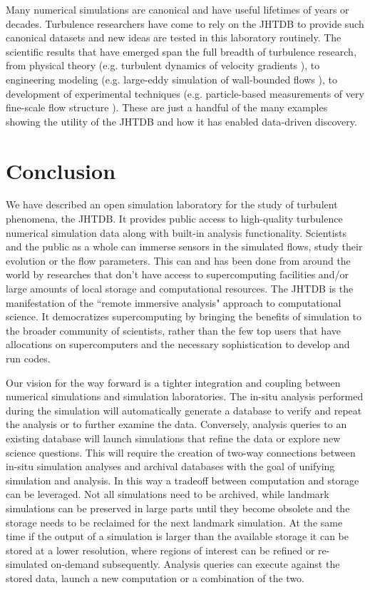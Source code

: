 \documentclass[10pt,twocolumn]{article}
\begin{document}
Many numerical simulations are canonical and have useful lifetimes of years or decades. Turbulence researchers have come to rely on the JHTDB to 
provide such canonical datasets and new ideas are tested in this laboratory routinely. The scientific results that have emerged span the full breadth of 
turbulence research, from physical theory (e.g. turbulent dynamics of velocity gradients \cite{luethi2009expanding}), to engineering modeling 
(e.g. large-eddy simulation of wall-bounded flows \cite{gungor2010new}), to development of experimental techniques 
(e.g. particle-based measurements of very fine-scale flow structure \cite{lawson2014scanning}).
These are just a handful of the many examples showing the utility of the 
JHTDB and how it has enabled data-driven discovery.

\section{Conclusion}
We have described an open simulation laboratory for the study of turbulent phenomena, the JHTDB. It provides public access to high-quality turbulence 
numerical simulation data along with built-in analysis functionality. Scientists and the public as a whole can immerse sensors in the simulated flows, study
their evolution or the flow parameters. This can and has been done from around the world by researches that don't have access to supercomputing facilities
and/or large amounts of local storage and computational resources. The JHTDB is the manifestation of the ``remote immersive analysis" approach to 
computational science. It democratizes supercomputing by bringing the benefits of simulation to the broader community of scientists, rather than the
few top users that have allocations on supercomputers and the necessary sophistication to develop and run codes.

Our vision for the way forward is a tighter integration and coupling between numerical simulations and simulation laboratories. The in-situ analysis
performed during the simulation will automatically generate a database to verify and repeat the analysis or to further examine the data. Conversely, 
analysis queries to an existing database will launch simulations that refine the data or explore new science questions. This will require the creation of
two-way connections between in-situ simulation analyses and archival databases with the goal of unifying simulation and analysis. 
{\color{red}In this way a tradeoff between computation and storage can be leveraged. Not all simulations need to be archived, while landmark simulations 
can be preserved in large parts until they become obsolete and the storage needs to be reclaimed for the next landmark simulation. At the same time
if the output of a simulation is larger than the available storage it can be stored at a lower resolution, where regions of interest can be refined or re-simulated
on-demand subsequently. Analysis queries can execute against the stored data, launch a new computation or a combination of the two.}
\end{document}
